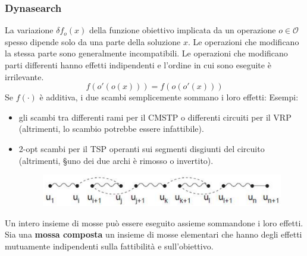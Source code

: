 \documentclass{article}
\begin{document}
\subsubsection{Dynasearch}
La variazione $\delta f_o(x)$ della funzione obiettivo implicata da un operazione $o\in\mathcal{O}$
spesso dipende solo da una parte della soluzione $x$. Le operazioni che modificano la stessa parte
sono generalmente incompatibili.
Le operazioni che modificano parti differenti hanno effetti indipendenti e l'ordine in cui sono
eseguite è irrilevante.
$$f(o'(o(x)))=f(o(o'(x)))$$
Se $f(\cdot)$ è additiva, i due scambi semplicemente sommano i loro effetti:
Esempi:
\begin{itemize}
    \item gli scambi tra differenti rami per il CMSTP o differenti circuiti per il VRP (altrimenti,
    lo scambio potrebbe essere infattibile).
    \item 2-opt scambi per il TSP operanti sui segmenti disgiunti del circuito (altrimenti,
    §uno dei due archi è rimosso o invertito).
    \begin{figure}[H]
        \centering
        \includegraphics[scale=0.5]{images/lez14_6.png}
    \end{figure}

\end{itemize}
Un intero insieme di mosse può essere eseguito assieme sommandone i loro effetti.
Sia una \textbf{mossa composta} un insieme di mosse elementari che hanno
degli effetti mutuamente indipendenti sulla fattibilità e sull'obiettivo.
\end{document}
